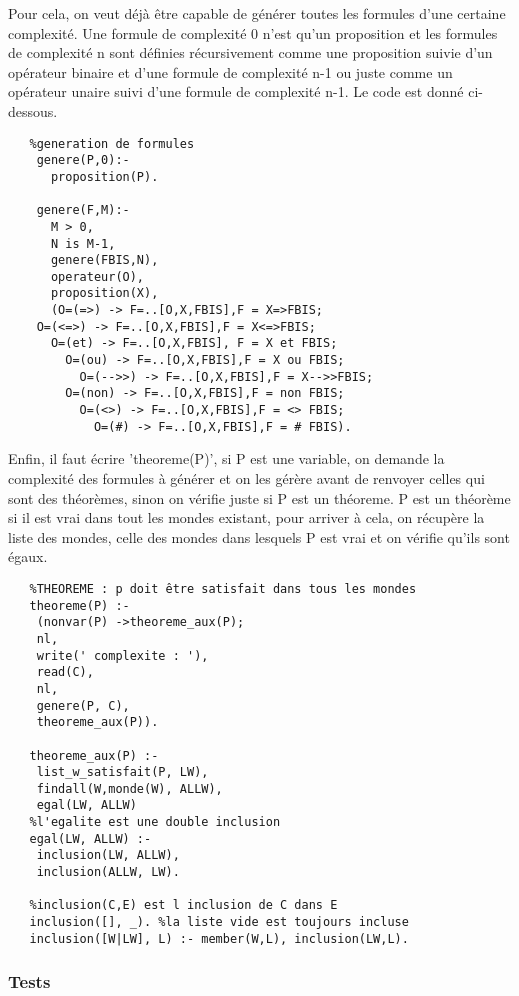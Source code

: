 \documentclass[a4paper,10pt]{article}
\begin{document}
   Pour cela, on veut d\'{e}j\`{a} \^{e}tre capable de g\'{e}n\'{e}rer toutes les formules d'une certaine complexit\'{e}. Une formule de complexit\'{e} 0 n'est qu'un
   proposition et les formules de complexit\'{e} n sont d\'{e}finies r\'{e}cursivement comme une proposition suivie d'un op\'{e}rateur binaire et d'une formule de
   complexit\'{e} n-1 ou juste comme un op\'{e}rateur unaire suivi d'une formule de complexit\'{e} n-1. Le code est donn\'{e} ci-dessous.
   \begin{lstlisting}
   %generation de formules
    genere(P,0):-
      proposition(P).

    genere(F,M):-
      M > 0,
      N is M-1,
      genere(FBIS,N),
      operateur(O),
      proposition(X),
      (O=(=>) -> F=..[O,X,FBIS],F = X=>FBIS;
	O=(<=>) -> F=..[O,X,FBIS],F = X<=>FBIS;
	  O=(et) -> F=..[O,X,FBIS], F = X et FBIS;
	    O=(ou) -> F=..[O,X,FBIS],F = X ou FBIS;
	      O=(-->>) -> F=..[O,X,FBIS],F = X-->>FBIS;
		O=(non) -> F=..[O,X,FBIS],F = non FBIS;
		  O=(<>) -> F=..[O,X,FBIS],F = <> FBIS;
		    O=(#) -> F=..[O,X,FBIS],F = # FBIS).
   \end{lstlisting}
   Enfin, il faut \'{e}crire 'theoreme(P)', si P est une variable, on demande la complexit\'{e} des formules \`{a} g\'{e}n\'{e}rer et on les g\'{e}r\`{e}re
   avant de renvoyer celles qui sont des th\'{e}or\`{e}mes, sinon on v\'{e}rifie juste si P est un th\'{e}oreme. P est un th\'{e}or\`{e}me si il est vrai
   dans tout les mondes existant, pour arriver \`{a} cela, on r\'{e}cup\`{e}re la liste des mondes, celle des mondes dans lesquels P est vrai et on v\'{e}rifie
   qu'ils sont \'{e}gaux.
   \begin{lstlisting}
   %THEOREME : p doit être satisfait dans tous les mondes
   theoreme(P) :-
	(nonvar(P) ->theoreme_aux(P);
	nl,
	write(' complexite : '),
	read(C),
	nl,
	genere(P, C),
	theoreme_aux(P)).

   theoreme_aux(P) :-
	list_w_satisfait(P, LW),
	findall(W,monde(W), ALLW),
	egal(LW, ALLW)
   %l'egalite est une double inclusion
   egal(LW, ALLW) :-
	inclusion(LW, ALLW),
	inclusion(ALLW, LW).

   %inclusion(C,E) est l inclusion de C dans E
   inclusion([], _). %la liste vide est toujours incluse
   inclusion([W|LW], L) :- member(W,L), inclusion(LW,L).
   \end{lstlisting}
   \subsubsection{Tests}
   
\end{document}
